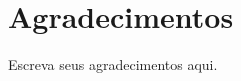 \clearpage
{}
\setcounter{page}{4}
\pagestyle{fancy}
\fancyhead{}
\fancyhead[RO,L]{\thepage}
\fancyhead[L]{}
\fancyfoot{}
\fancyfoot[L,RO]{}
\fancyfoot[LO,C]{}
\fancyfoot[CO,R]{}
\vspace*{0.7cm}
\section*{\hfill Agradecimentos}
\vspace{0.5cm}
Escreva seus agradecimentos aqui.
\newpage
